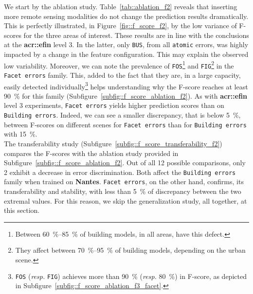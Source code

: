        We start by the ablation study.
        Table~\ref{tab::ablation_f2} reveals that inserting more remote sensing modalities do not change the prediction results dramatically.
        This is perfectly illustrated, in Figure~\ref{fig::f_score_f2}, by the low variance of F-scores for the three areas of interest.
        These results are in line with the conclusions at the \textbf{\gls{acr::efin}} level 3.
        In the latter, only \texttt{BUS}, from all \texttt{atomic} errors, was highly impacted by a change in the feature configuration.
        This may explain the observed low variability.
        Moreover, we can note the prevalence of \texttt{FOS}\footnote{
            Between \SIrange[range-phrase={ and }]{60}{85}{\percent} of building models, in all areas, have this defect.
        } and \texttt{FIG}\footnote{
            They affect between \SIrange[range-phrase={ and }]{70}{95}{\percent} of building models, depending on the urban scene.
        } in the \texttt{Facet errors} family.
        This, added to the fact that they are, in a large capacity, easily detected individually\footnote{
            \texttt{FOS} (\textit{resp.} \texttt{FIG}) achieves more than \SI{90}{\percent} (\textit{resp.} \SI{80}{\percent}) in F-score, as depicted in Subfigure~\ref{subfig::f_score_ablation_f3_facet}.
        } helps understanding why the F-score reaches at least \SI{90}{\percent} for this family (Subfigure~\ref{subfig::f_score_ablation_f2}).
        As with \textbf{\gls{acr::efin}} level 3 experiments, \texttt{Facet errors} yields higher prediction scores than on \texttt{Building errors}.
        Indeed, we can see a smaller discrepancy, that is below \SI{5}{\percent}, between F-scores on different scenes for \texttt{Facet errors} than for \texttt{Building errors} with \SI{15}{\percent}.\\

        The transferability study (Subfigure~\ref{subfig::f_score_transferability_f2}) compares the F-scores with the ablation study provided in Subfigure~\ref{subfig::f_score_ablation_f2}.
        Out of all 12 possible comparisons, only 2 exhibit a decrease in error discrimination.
        Both affect the \texttt{Building errors} family when trained on \textbf{Nantes}.
        \texttt{Facet errors}, on the other hand, confirms, its transferability and stability, with less than \SI{5}{\percent} of discrepancy between the two extremal values.
        For this reason, we skip the generalization study, all together, at this section.\\

